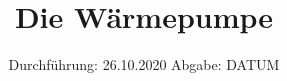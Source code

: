 

\subject{D 206}
\title{Die Wärmepumpe}
\date{
  Durchführung: 26.10.2020
  \hspace{3em}
  Abgabe: DATUM
}



\maketitle
\thispagestyle{empty}
\tableofcontents
\newpage






\printbibliography{}


